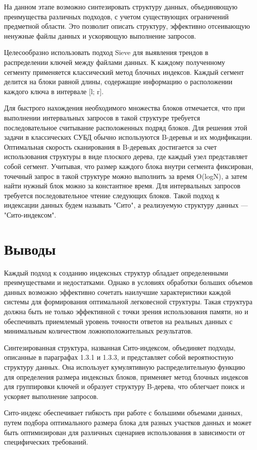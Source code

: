 На данном этапе возможно синтезировать структуру данных, объединяющую преимущества различных подходов, с учетом существующих ограничений предметной области. Это позволит описать структуру, эффективно отсеивающую ненужные файлы данных и ускоряющую выполнение запросов.

Целесообразно использовать подход Sieve для выявления трендов в распределении ключей между файлами данных. К каждому полученному сегменту применяется классический метод блочных индексов. Каждый сегмент делится на блоки равной длины, содержащие информацию о расположении каждого ключа в интервале [l; r].

Для быстрого нахождения необходимого множества блоков отмечается, что при выполнении интервальных запросов в такой структуре требуется последовательное считывание расположенных подряд блоков. Для решения этой задачи в классических СУБД обычно используются B-деревья и их модификации. Оптимальная скорость сканирования в B-деревьях достигается за счет использования структуры в виде плоского дерева, где каждый узел представляет собой сегмент. Учитывая, что размер каждого блока внутри сегмента фиксирован, точечный запрос в такой структуре можно выполнить за время O(logN), а затем найти нужный блок можно за константное время. Для интервальных запросов требуется последовательное чтение следующих блоков. Такой подход к индексации данных будем называть "Сито", а реализуемую структуру данных — "Сито-индексом".

\section*{Выводы}

Каждый подход к созданию индексных структур обладает определенными преимуществами и недостатками. Однако в условиях обработки больших объемов данных возможно эффективно сочетать наилучшие характеристики каждой системы для формирования оптимальной легковесной структуры. Такая структура должна быть не только эффективной с точки зрения использования памяти, но и обеспечивать приемлемый уровень точности ответов на реальных данных с минимальным количеством ложноположительных результатов.

Синтезированная структура, названная Сито-индексом, объединяет подходы, описанные в параграфах 1.3.1 и 1.3.3, и представляет собой вероятностную структуру данных. Она использует кумулятивную распределительную функцию для определения размера индексных блоков, применяет метод блочных индексов для группировки ключей и образует структуру B-дерева, что облегчает поиск и ускоряет выполнение запросов.

Сито-индекс обеспечивает гибкость при работе с большими объемами данных, путем подбора оптимального размера блока для разных участков данных и может быть оптимизирован для различных сценариев использования в зависимости от специфических требований.
